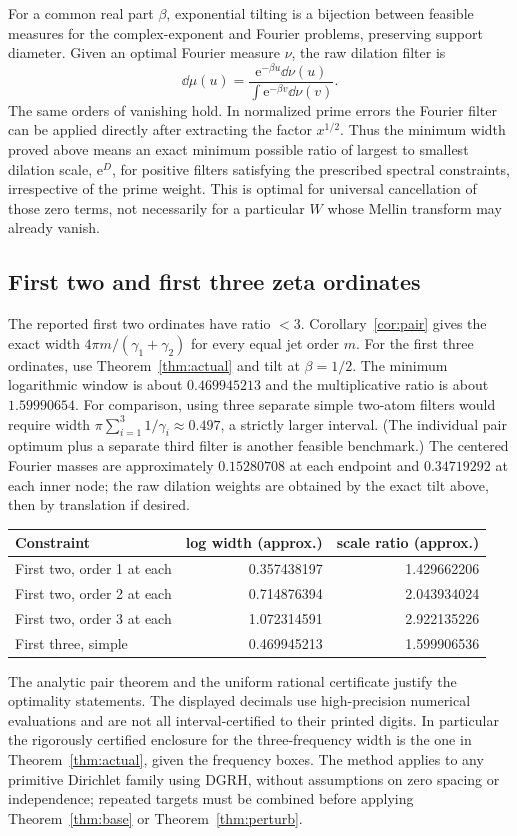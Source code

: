\documentclass[11pt]{article}
\theoremstyle{remark}\newtheorem{remark}[theorem]{Remark}
\newcommand{\e}{\mathrm e}\newcommand{\norm}[1]{\left\|#1\right\|}
\begin{document}
For a common real part $\beta$, exponential tilting is a bijection between feasible measures for the complex-exponent and Fourier problems, preserving support diameter. Given an optimal Fourier measure $\nu$, the raw dilation filter is
\[
 \dd\mu(u)=\frac{\e^{-\beta u}\dd\nu(u)}{\int\e^{-\beta v}\dd\nu(v)}.
\]
The same orders of vanishing hold. In normalized prime errors the Fourier filter can be applied directly after extracting the factor $x^{1/2}$. Thus the minimum width proved above means an exact minimum possible ratio of largest to smallest dilation scale, $\e^D$, for positive filters satisfying the prescribed spectral constraints, irrespective of the prime weight. This is optimal for universal cancellation of those zero terms, not necessarily for a particular $W$ whose Mellin transform may already vanish.

\subsection{First two and first three zeta ordinates}
The reported first two ordinates have ratio $<3$. Corollary~\ref{cor:pair} gives the exact width $4\pi m/(\gamma_1+\gamma_2)$ for every equal jet order $m$. For the first three ordinates, use Theorem~\ref{thm:actual} and tilt at $\beta=1/2$. The minimum logarithmic window is about $0.469945213$ and the multiplicative ratio is about $1.59990654$. For comparison, using three separate simple two-atom filters would require width $\pi\sum_{i=1}^3 1/\gamma_i\approx0.497$, a strictly larger interval. (The individual pair optimum plus a separate third filter is another feasible benchmark.) The centered Fourier masses are approximately $0.15280708$ at each endpoint and $0.34719292$ at each inner node; the raw dilation weights are obtained by the exact tilt above, then by translation if desired.
\begin{center}
\begin{tabular}{lrr}
\toprule
Constraint & log width (approx.) & scale ratio (approx.)\\
\midrule
First two, order 1 at each & 0.357438197 & 1.429662206\\
First two, order 2 at each & 0.714876394 & 2.043934024\\
First two, order 3 at each & 1.072314591 & 2.922135226\\
First three, simple & 0.469945213 & 1.599906536\\
\bottomrule
\end{tabular}
\end{center}
The analytic pair theorem and the uniform rational certificate justify the optimality statements. The displayed decimals use high-precision numerical evaluations and are not all interval-certified to their printed digits. In particular the rigorously certified enclosure for the three-frequency width is the one in Theorem~\ref{thm:actual}, given the frequency boxes. The method applies to any primitive Dirichlet family using DGRH, without assumptions on zero spacing or independence; repeated targets must be combined before applying Theorem~\ref{thm:base} or Theorem~\ref{thm:perturb}.
\end{document}
